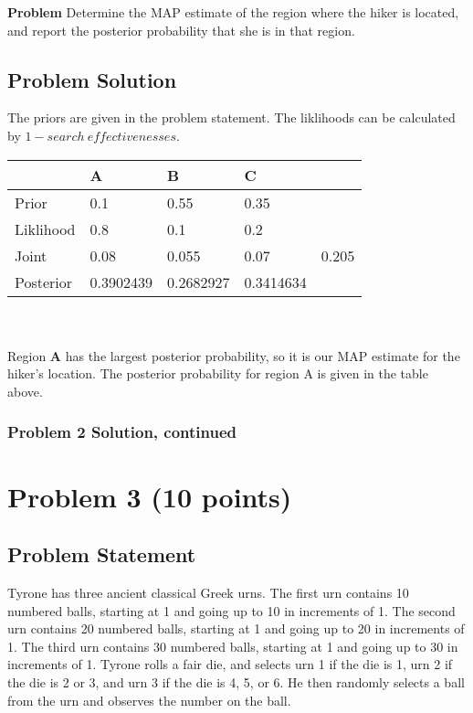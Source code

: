 \documentclass[12pt]{article}
\theoremstyle{definition}
\begin{document}
\bigskip
\noindent
{\bf Problem} Determine the MAP estimate of the region where the hiker is located, and report the posterior probability that she is in that region.\\


\subsection*{Problem Solution}
The priors are given in the problem statement. The liklihoods can be calculated by $1 - search\ effectivenesses$.

\begin{tabular}{lllll}
&   A   &   B   &   C   \\
\hline
Prior      &   0.1   &   0.55   &   0.35   &\\
Liklihood  &   0.8   &   0.1   &   0.2   &\\
Joint      &   0.08   &   0.055   &   0.07   &   0.205\\
Posterior  &   0.3902439   &   0.2682927   &   0.3414634   &\\
\hline
\end{tabular}
\\\\

Region \textbf{A} has the largest posterior probability, so it is our MAP estimate for the hiker's location. The posterior probability for region A is given in the table above.
\newpage
\subsubsection*{Problem 2 Solution, continued}

\newpage
\section*{Problem 3 (10 points)}

\subsection*{Problem Statement}

Tyrone has three ancient classical Greek urns. The first urn contains 10 numbered balls, starting at 1 and going up to 10 in increments of 1. The second urn contains 20 numbered balls, starting at 1 and going up to 20 in increments of 1. The third urn contains 30 numbered balls, starting at 1 and going up to 30 in increments of 1. Tyrone rolls a fair die, and selects urn 1 if the die is 1, urn 2 if the die is 2 or 3, and urn 3 if the die is 4, 5, or 6. He then randomly selects a ball from the urn and observes the number on the ball.
\end{document}
